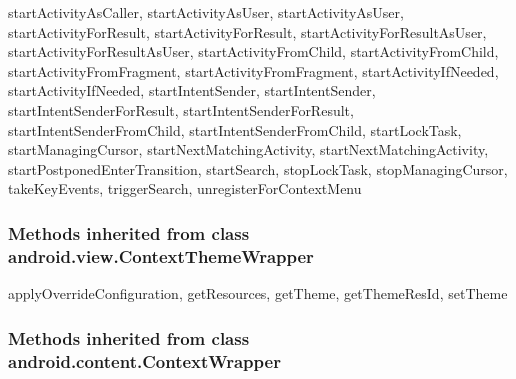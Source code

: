startActivityAsCaller, startActivityAsUser, startActivityAsUser, startActivityForResult, startActivityForResult, startActivityForResultAsUser, startActivityForResultAsUser, startActivityFromChild, startActivityFromChild, startActivityFromFragment, startActivityFromFragment, startActivityIfNeeded, startActivityIfNeeded, startIntentSender, startIntentSender, startIntentSenderForResult, startIntentSenderForResult, startIntentSenderFromChild, startIntentSenderFromChild, startLockTask, startManagingCursor, startNextMatchingActivity, startNextMatchingActivity, startPostponedEnterTransition, startSearch, stopLockTask, stopManagingCursor, takeKeyEvents, triggerSearch, unregisterForContextMenu\\

\subsubsection{Methods inherited from class android.view.ContextThemeWrapper}

applyOverrideConfiguration, getResources, getTheme, getThemeResId, setTheme\\

\subsubsection{Methods inherited from class android.content.ContextWrapper}

